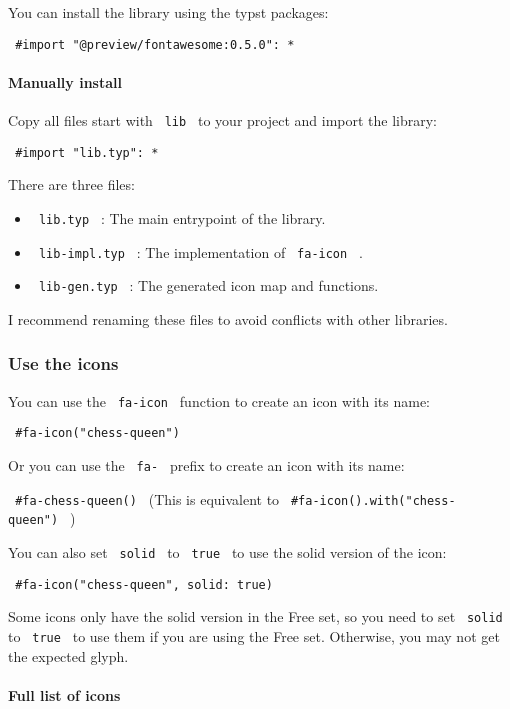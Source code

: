 You can install the library using the typst packages:

\texttt{\ \#import\ "@preview/fontawesome:0.5.0":\ *\ }

\paragraph{Manually install}\label{manually-install}

Copy all files start with \texttt{\ lib\ } to your project and import
the library:

\texttt{\ \#import\ "lib.typ":\ *\ }

There are three files:

\begin{itemize}
\tightlist
\item
  \texttt{\ lib.typ\ } : The main entrypoint of the library.
\item
  \texttt{\ lib-impl.typ\ } : The implementation of \texttt{\ fa-icon\ }
  .
\item
  \texttt{\ lib-gen.typ\ } : The generated icon map and functions.
\end{itemize}

I recommend renaming these files to avoid conflicts with other
libraries.

\subsubsection{Use the icons}\label{use-the-icons}

You can use the \texttt{\ fa-icon\ } function to create an icon with its
name:

\texttt{\ \#fa-icon("chess-queen")\ }

Or you can use the \texttt{\ fa-\ } prefix to create an icon with its
name:

\texttt{\ \#fa-chess-queen()\ } (This is equivalent to
\texttt{\ \#fa-icon().with("chess-queen")\ } )

You can also set \texttt{\ solid\ } to \texttt{\ true\ } to use the
solid version of the icon:

\texttt{\ \#fa-icon("chess-queen",\ solid:\ true)\ }

Some icons only have the solid version in the Free set, so you need to
set \texttt{\ solid\ } to \texttt{\ true\ } to use them if you are using
the Free set. Otherwise, you may not get the expected glyph.

\paragraph{Full list of icons}\label{full-list-of-icons}

